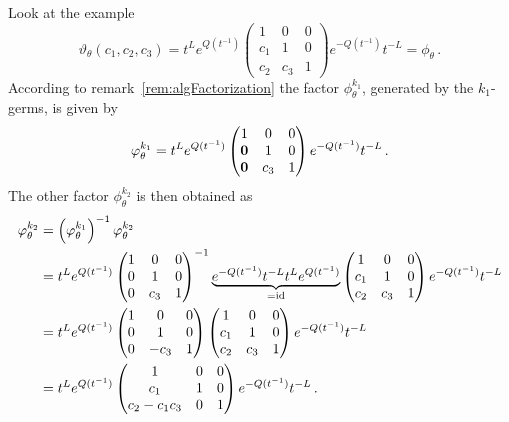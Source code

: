 \begin{exmp}
  Look at the example
  \[
    \vartheta_\theta(c_1,c_2,c_3)=
    t^{L}e^{Q(t^{-1})}
    \begin{pmatrix}
      1 & 0 & 0
    \\c_1 & 1 & 0
    \\c_2 & c_3 & 1
    \end{pmatrix}
    e^{-Q(t^{-1})}t^{-L}
    =\phi_\theta
    \,.
  \]
  According to remark~\ref{rem:algFactorization} the factor
  $\phi_\theta^{k_1}$, generated by the $k_1$-germs, is given by
  \[
    \phi_\theta^{k_1}=
    t^{L}e^{Q(t^{-1})}
    \begin{pmatrix}
      1 & 0 & 0
    \\\text{\boldmath $0$} & 1 & 0
    \\\text{\boldmath $0$} & c_3 & 1
    \end{pmatrix}
    e^{-Q(t^{-1})}t^{-L} \,.
  \]
  The other factor $\phi_\theta^{k_2}$ is then obtained as
  \begin{align*}
    \phi_\theta^{k_2}&=
    \left(\phi_\theta^{k_1}\right)^{-1}
    \phi_\theta^{k_2}
  \\&=t^{L}e^{Q(t^{-1})}
    \begin{pmatrix}
      1     & 0    & 0
    \\0     & 1    & 0
    \\0     & c_3 & 1
    \end{pmatrix}^{-1}
    \underset{=\id}{\underbrace{%
        e^{-Q(t^{-1})}t^{-L}
        t^{L}e^{Q(t^{-1})}
    }}
    \begin{pmatrix}
      1     & 0 & 0
    \\c_1     & 1     & 0
    \\c_2     & c_3 & 1
    \end{pmatrix}
    e^{-Q(t^{-1})}t^{-L}
  \\&=t^{L}e^{Q(t^{-1})}
    \begin{pmatrix}
      1     & 0    & 0
    \\0     & 1    & 0
    \\0     & -c_3 & 1
    \end{pmatrix}
    \begin{pmatrix}
      1     & 0 & 0
    \\c_1     & 1     & 0
    \\c_2     & c_3 & 1
    \end{pmatrix}
    e^{-Q(t^{-1})}t^{-L}
  \\&=t^{L}e^{Q(t^{-1})}
    \begin{pmatrix}
      1     & 0 & 0
    \\c_1     & 1          & 0
    \\c_2-c_1c_3     & 0          & 1
    \end{pmatrix}
    e^{-Q(t^{-1})}t^{-L}
    \,.
  \end{align*}
\end{exmp}

